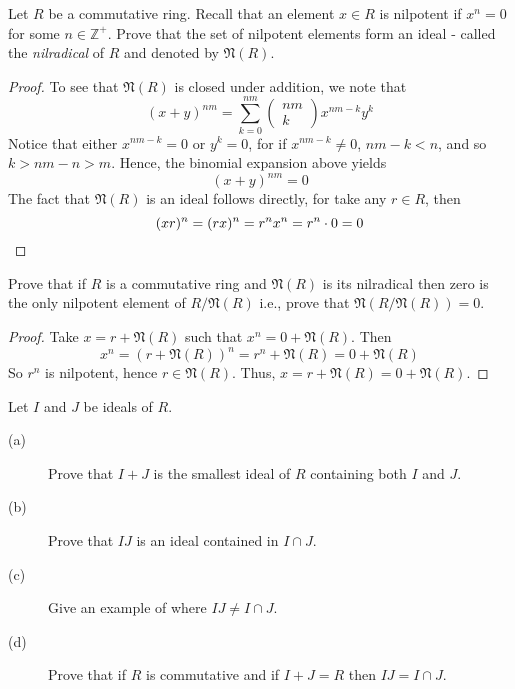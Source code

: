 \documentclass[12pt,leqno]{book}
\numberwithin{equation}{section}
\newcommand{\question}[2] {\vspace{.25in}\noindent\fbox{#1} #2 \vspace{.10in}}
\theoremstyle{definition}
\begin{document}
\question{29.}{Let $R$ be a commutative ring. Recall that an element $x\in R$ is nilpotent if $x^n=0$ for some $n\in\mathbb{Z}^+$. Prove that the set of nilpotent elements form an ideal - called the \textit{nilradical} of $R$ and denoted by $\mathfrak{N}(R)$.}

\begin{proof}
 To see that $\mathfrak{N}(R)$ is closed under addition, we note that \[(x+y)^{nm}=\sum_{k=0}^{nm}\begin{pmatrix}nm\\k\end{pmatrix}x^{nm-k}y^k\] Notice that either $x^{nm-k}=0$ or $y^k=0$, for if $x^{nm-k}\not=0$, $nm-k<n$, and so $k>nm-n>m$. Hence, the binomial expansion above yields \[(x+y)^{nm}=0\] The fact that $\mathfrak{N}(R)$ is an ideal follows directly, for take any $r\in R$, then\[(xr)^n=(rx)^n=r^nx^n=r^n\cdot0=0\qedhere\]
\end{proof}

\question{30.}{Prove that if $R$ is a commutative ring and $\mathfrak{N}(R)$ is its nilradical then zero is the only nilpotent element of $R/\mathfrak{N}(R)$ i.e., prove that $\mathfrak{N}(R/\mathfrak{N}(R))=0$.}

\begin{proof}
 Take $x=r+\mathfrak{N}(R)$ such that $x^n=0+\mathfrak{N}(R)$. Then \[x^n=\left(r+\mathfrak{N}(R)\right)^n=r^n+\mathfrak{N}(R)=0+\mathfrak{N}(R)\] So $r^n$ is nilpotent, hence $r\in\mathfrak{N}(R)$. Thus, $x=r+\mathfrak{N}(R)=0+\mathfrak{N}(R)$.
\end{proof}

\question{34.}{Let $I$ and $J$ be ideals of $R$.}
\begin{description}
 \item [(a)] Prove that $I+J$ is the smallest ideal of $R$ containing both $I$ and $J$.
 \item [(b)] Prove that $IJ$ is an ideal contained in $I\cap J$.
 \item [(c)] Give an example of where $IJ\not=I\cap J$.
 \item [(d)] Prove that if $R$ is commutative and if $I+J=R$ then $IJ=I\cap J$.
\end{description}
\end{document}
